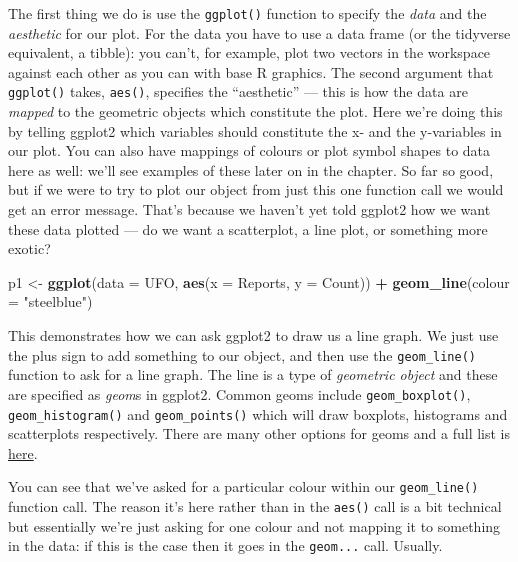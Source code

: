 \documentclass[
]{book}
\newenvironment{Shaded}{\begin{snugshade}}{\end{snugshade}}
\newcommand{\DataTypeTok}[1]{\textcolor[rgb]{0.13,0.29,0.53}{#1}}
\newcommand{\KeywordTok}[1]{\textcolor[rgb]{0.13,0.29,0.53}{\textbf{#1}}}
\newcommand{\NormalTok}[1]{#1}
\newcommand{\OperatorTok}[1]{\textcolor[rgb]{0.81,0.36,0.00}{\textbf{#1}}}
\newcommand{\StringTok}[1]{\textcolor[rgb]{0.31,0.60,0.02}{#1}}
\begin{document}
The first thing we do is use the \texttt{ggplot()} function to specify the \emph{data} and the \emph{aesthetic} for our plot. For the data you have to use a data frame (or the tidyverse equivalent, a tibble): you can't, for example, plot two vectors in the workspace against each other as you can with base R graphics. The second argument that \texttt{ggplot()} takes, \texttt{aes()}, specifies the ``aesthetic'' --- this is how the data are \emph{mapped} to the geometric objects which constitute the plot. Here we're doing this by telling ggplot2 which variables should constitute the x- and the y-variables in our plot. You can also have mappings of colours or plot symbol shapes to data here as well: we'll see examples of these later on in the chapter. So far so good, but if we were to try to plot our object from just this one function call we would get an error message. That's because we haven't yet told ggplot2 how we want these data plotted --- do we want a scatterplot, a line plot, or something more exotic?

\begin{Shaded}
\begin{Highlighting}[]
\NormalTok{p1 <-}\StringTok{ }\KeywordTok{ggplot}\NormalTok{(}\DataTypeTok{data =}\NormalTok{ UFO, }\KeywordTok{aes}\NormalTok{(}\DataTypeTok{x =}\NormalTok{ Reports, }
                             \DataTypeTok{y =}\NormalTok{ Count)) }\OperatorTok{+}
\StringTok{               }\KeywordTok{geom_line}\NormalTok{(}\DataTypeTok{colour =} \StringTok{"steelblue"}\NormalTok{)}
\end{Highlighting}
\end{Shaded}

This demonstrates how we can ask ggplot2 to draw us a line graph. We just use the plus sign to add something to our object, and then use the \texttt{geom\_line()} function to ask for a line graph. The line is a type of \emph{geometric object} and these are specified as \emph{geom}s in ggplot2. Common geoms include \texttt{geom\_boxplot()}, \texttt{geom\_histogram()} and \texttt{geom\_points()} which will draw boxplots, histograms and scatterplots respectively. There are many other options for geoms and a full list is \href{https://ggplot2.tidyverse.org/reference/index.html}{here}.

You can see that we've asked for a particular colour within our \texttt{geom\_line()} function call. The reason it's here rather than in the \texttt{aes()} call is a bit technical but essentially we're just asking for one colour and not mapping it to something in the data: if this is the case then it goes in the \texttt{geom...} call. Usually.
\end{document}
